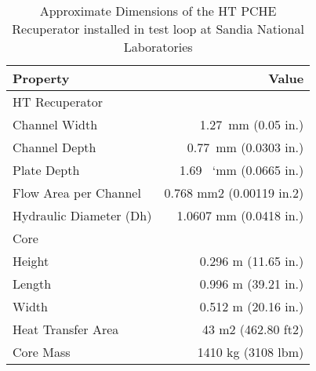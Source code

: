 \begin{table}
\label{tab:Approximate}
\caption{Approximate Dimensions of the HT PCHE Recuperator installed in test loop at Sandia National Laboratories \cite{Pasch2012}}
\begin{center}
\begin{tabulary}{0.9\textwidth}{LR}
\toprule
Property 	&	Value	\\
\midrule
HT Recuperator	&		\\
Channel Width 	&	1.27~mm (0.05 in.)	\\
Channel Depth 	&	0.77~mm (0.0303 in.)	\\
Plate Depth	&	 1.69 ~`mm (0.0665 in.)	\\
Flow Area per Channel 	&	0.768 mm2 (0.00119 in.2)	\\
Hydraulic Diameter (Dh) 	&	1.0607 mm (0.0418 in.)	\\
Core	&		\\
Height 	&	0.296 m (11.65 in.)	\\
Length 	&	0.996 m (39.21 in.)	\\
Width 	&	0.512 m (20.16 in.)	\\
Heat Transfer Area 	&	43 m2 (462.80 ft2)	\\
Core Mass	&	 1410 kg (3108 lbm)	\\

\bottomrule
\end{tabulary}
\end{center}
\end{table}